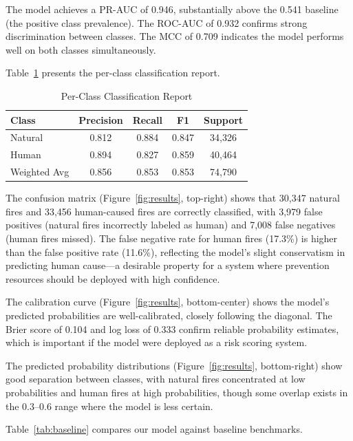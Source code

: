 \documentclass[sigconf,nonacm]{acmart}
\begin{document}
The model achieves a PR-AUC of 0.946, substantially above the 0.541 baseline (the positive class prevalence). The ROC-AUC of 0.932 confirms strong discrimination between classes. The MCC of 0.709 indicates the model performs well on both classes simultaneously.

Table~\ref{tab:classreport} presents the per-class classification report.

\begin{table}[t]
\caption{Per-Class Classification Report}
\label{tab:classreport}
\small
\centering
\begin{tabular}{lcccc}
\toprule
\textbf{Class} & \textbf{Precision} & \textbf{Recall} & \textbf{F1} & \textbf{Support} \\
\midrule
Natural & 0.812 & 0.884 & 0.847 & 34,326 \\
Human & 0.894 & 0.827 & 0.859 & 40,464 \\
\midrule
Weighted Avg & 0.856 & 0.853 & 0.853 & 74,790 \\
\bottomrule
\end{tabular}
\end{table}

The confusion matrix (Figure~\ref{fig:results}, top-right) shows that 30,347 natural fires and 33,456 human-caused fires are correctly classified, with 3,979 false positives (natural fires incorrectly labeled as human) and 7,008 false negatives (human fires missed). The false negative rate for human fires (17.3\%) is higher than the false positive rate (11.6\%), reflecting the model's slight conservatism in predicting human cause---a desirable property for a system where prevention resources should be deployed with high confidence.

The calibration curve (Figure~\ref{fig:results}, bottom-center) shows the model's predicted probabilities are well-calibrated, closely following the diagonal. The Brier score of 0.104 and log loss of 0.333 confirm reliable probability estimates, which is important if the model were deployed as a risk scoring system.

The predicted probability distributions (Figure~\ref{fig:results}, bottom-right) show good separation between classes, with natural fires concentrated at low probabilities and human fires at high probabilities, though some overlap exists in the 0.3--0.6 range where the model is less certain.

Table~\ref{tab:baseline} compares our model against baseline benchmarks.
\end{document}
